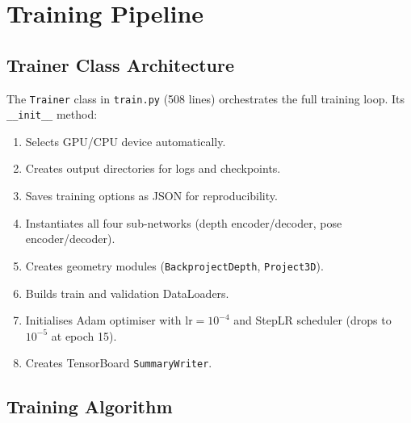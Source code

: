 \documentclass[10pt, a4paper, twocolumn]{article}
\begin{document}
\section{Training Pipeline}
\label{sec:training}

\subsection{Trainer Class Architecture}

The \texttt{Trainer} class in \texttt{train.py} (508 lines) orchestrates the full training loop. Its \texttt{\_\_init\_\_} method:

\begin{enumerate}[noitemsep]
    \item Selects GPU/CPU device automatically.
    \item Creates output directories for logs and checkpoints.
    \item Saves training options as JSON for reproducibility.
    \item Instantiates all four sub-networks (depth encoder/decoder, pose encoder/decoder).
    \item Creates geometry modules (\texttt{BackprojectDepth}, \texttt{Project3D}).
    \item Builds train and validation DataLoaders.
    \item Initialises Adam optimiser with $\text{lr}=10^{-4}$ and StepLR scheduler (drops to $10^{-5}$ at epoch 15).
    \item Creates TensorBoard \texttt{SummaryWriter}.
\end{enumerate}

\subsection{Training Algorithm}
\end{document}
